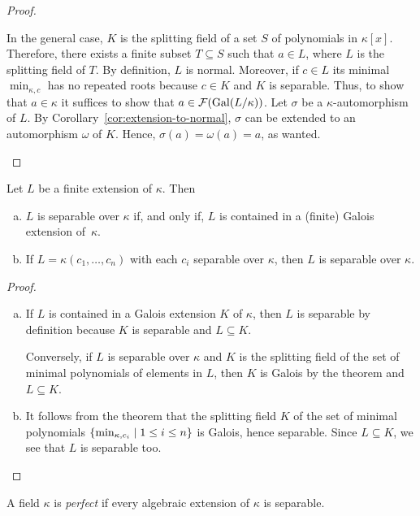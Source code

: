 \begin{proof}
\begin{enumerate}[a), font=\upshape]
        In the general case, $K$ is the splitting field of a set $S$ of polynomials in $\kappa[x]$. Therefore, there exists a finite subset $T\subseteq S$ such that $a\in L$, where $L$ is the splitting field of $T$. By definition, $L$ is normal. Moreover, if $c\in L$ its minimal $\min_{\kappa,c}$ has no repeated roots because $c\in K$ and $K$ is separable. Thus, to show that $a\in\kappa$ it suffices to show that $a\in\mathcal F(\operatorname{Gal}(L/\kappa))$. Let $\sigma$ be a $\kappa$-automorphism of $L$. By Corollary~\ref{cor:extension-to-normal}, $\sigma$ can be extended to an automorphism $\omega$ of $K$. Hence, $\sigma(a)=\omega(a)=a$, as wanted. \qedhere
    \end{enumerate}
\end{proof}

\begin{cor}\label{cor:separable-iff-in-Galois}
    Let\/ $L$ be a finite extension of\/ $\kappa$. Then
    \begin{enumerate}[a), font=\upshape]
        \item $L$ is separable over\/ $\kappa$ if, and only if, $L$ is contained in a (finite) Galois extension of\/~$\kappa$.
        \item If\/ $L = \kappa(c_1, \dots, c_n)$ with each\/ $c_i$ separable over\/ $\kappa$, then\/ $L$ is separable over\/ $\kappa$.
    \end{enumerate}
\end{cor}

\begin{proof}${}$
    \begin{enumerate}[a), font=\upshape]
        \item If $L$ is contained in a Galois extension $K$ of $\kappa$, then $L$ is separable by definition because $K$ is separable and $L\subseteq K$.

        Conversely, if $L$ is separable over $\kappa$ and $K$ is the splitting field of the set of minimal polynomials of elements in $L$, then $K$ is Galois by the theorem and $L\subseteq K$.

        \item It follows from the theorem that the splitting field $K$ of the set of minimal polynomials $\{\min_{\kappa,c_i}\mid 1\le i\le n\}$ is Galois, hence separable. Since $L\subseteq K$, we see that $L$ is separable too.
    \end{enumerate}
\end{proof}

\begin{defn}
    A field\/ $\kappa$ is \textsl{perfect} if every algebraic extension of\/ $\kappa$ is separable.
\end{defn}

